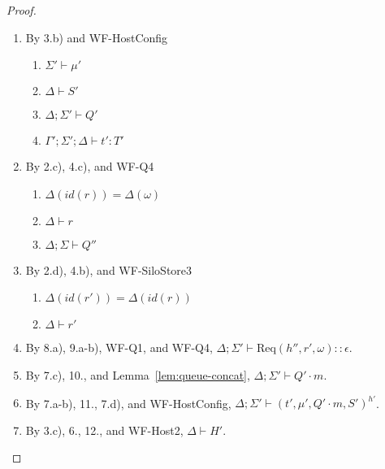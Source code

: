 \documentclass{article}
\theoremstyle{definition}
\newcommand{\Req}[3]{\text{Req}(#1, #2, #3)}
\begin{document}
\begin{proof}
\begin{itemize}
\begin{enumerate}
\item By 3.b) and WF-HostConfig
  \begin{enumerate}[label=(\alph*)]
  \item $\Sigma' \vdash \mu'$
  \item $\Delta \vdash S'$
  \item $\Delta ; \Sigma' \vdash Q'$
  \item $\Gamma' ; \Sigma' ; \Delta \vdash t' : T'$
  \end{enumerate}
\item By 2.c), 4.c), and WF-Q4
  \begin{enumerate}[label=(\alph*)]
  \item $\Delta(id(r)) = \Delta(\omega)$
  \item $\Delta \vdash r$
  \item $\Delta ; \Sigma \vdash Q''$
  \end{enumerate}
\item By 2.d), 4.b), and WF-SiloStore3
  \begin{enumerate}[label=(\alph*)]
  \item $\Delta(id(r')) = \Delta(id(r))$
  \item $\Delta \vdash r'$
  \end{enumerate}
\item By 8.a), 9.a-b), WF-Q1, and WF-Q4, $\Delta ; \Sigma' \vdash {\Req {h''} {r'} \omega} :: \epsilon$.
\item By 7.c), 10., and Lemma~\ref{lem:queue-concat}, $\Delta ; \Sigma' \vdash Q' \cdot m$.
\item By 7.a-b), 11., 7.d), and WF-HostConfig, $\Delta ; \Sigma' \vdash (t', \mu', Q' \cdot m, S')^{h'}$.
\item By 3.c), 6., 12., and WF-Host2, $\Delta \vdash H'$.
\end{enumerate}


\end{itemize}

\end{proof}

\newpage
\end{document}
